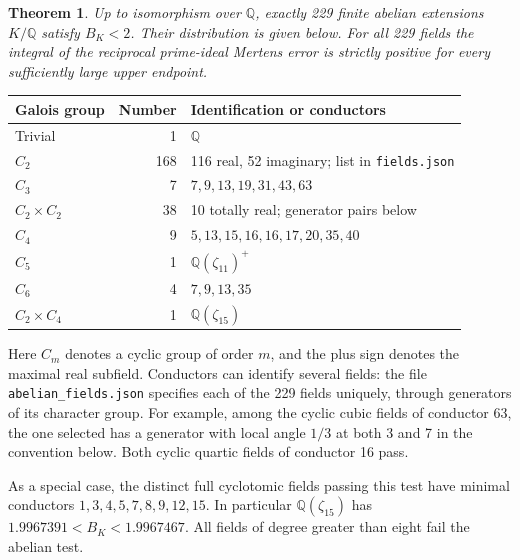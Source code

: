 \documentclass[11pt]{article}
\newtheorem{theorem}{Theorem}
\newcommand{\Q}{\mathbb Q}\newcommand{\R}{\mathbb R}
\begin{document}
\begin{theorem}\label{thm:Zhao}
Up to isomorphism over $\Q$, exactly 229 finite abelian extensions $K/\Q$ satisfy $B_K<2$. Their distribution is given below. For all 229 fields the integral of the reciprocal prime-ideal Mertens error is strictly positive for every sufficiently large upper endpoint.
\end{theorem}
\begin{center}\small\begin{tabular}{@{}lrl@{}}\toprule
Galois group & Number & Identification or conductors \\\midrule
Trivial & 1 & $\Q$\\
$C_2$ & 168 & 116 real, 52 imaginary; list in \texttt{fields.json}\\
$C_3$ & 7 & $7,9,13,19,31,43,63$\\
$C_2\times C_2$ & 38 & 10 totally real; generator pairs below\\
$C_4$ & 9 & $5,13,15,16,16,17,20,35,40$\\
$C_5$ & 1 & $\Q(\zeta_{11})^+$\\
$C_6$ & 4 & $7,9,13,35$\\
$C_2\times C_4$ & 1 & $\Q(\zeta_{15})$\\ \bottomrule
\end{tabular}\end{center}
Here $C_m$ denotes a cyclic group of order $m$, and the plus sign denotes the maximal real subfield. Conductors can identify several fields: the file \texttt{abelian\_fields.json} specifies each of the 229 fields uniquely, through generators of its character group. For example, among the cyclic cubic fields of conductor 63, the one selected has a generator with local angle $1/3$ at both 3 and 7 in the convention below. Both cyclic quartic fields of conductor 16 pass.

As a special case, the distinct full cyclotomic fields passing this test have minimal conductors $1,3,4,5,7,8,9,12,15$. In particular $\Q(\zeta_{15})$ has $1.9967391<B_K<1.9967467$. All fields of degree greater than eight fail the abelian test.
\end{document}
